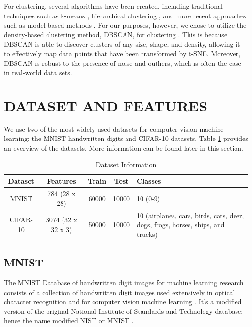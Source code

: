 \documentclass[12pt]{article}
\begin{document}
For clustering, several algorithms have been created, including traditional techniques such as k-means \cite{macqueen1967}, hierarchical clustering \cite{johnson1967}, and more recent approaches such as model-based methods \cite{fraley2002}. For our purposes, however, we chose to utilize the density-based clustering method, DBSCAN, for clustering \cite{ester1996}. This is because DBSCAN is able to discover clusters of any size, shape, and density, allowing it to effectively map data points that have been transformed by t-SNE. Moreover, DBSCAN is robust to the presence of noise and outliers, which is often the case in real-world data sets.


\section{DATASET AND FEATURES}

We use two of the most widely used datasets for computer vision machine learning: the MNIST handwritten digits and CIFAR-10 datasets. Table \ref{tab:datasets} provides an overview of the datasets. More information can be found later in this section.

\begin{table}[H]
    \centering
    \begin{tabular}{|c|c|c|c|p{7cm}|}
        \hline
        \textbf{Dataset} & \textbf{Features} & \textbf{Train} & \textbf{Test} & \textbf{Classes}   \\
        \hline
        MNIST & 784 (28 x 28) & 60000 & 10000 & 10 (0-9) \\ 
        CIFAR-10 & 3074 (32 x 32 x 3) & 50000 & 10000 & 10 \newline (airplanes, cars, birds, cats, deer, dogs, frogs, horses, ships, and trucks)\\
        \hline
    \end{tabular}
    \caption{Dataset Information}
    \label{tab:datasets}
\end{table}

\subsection{MNIST}

The MNIST Database of handwritten digit images for machine learning research consists of a collection of handwritten digit images used extensively in optical character recognition and for computer vision machine learning \cite{deng2012}. It’s a modified version of the original National Institute of Standards and Technology database; hence the name modified NIST or MNIST \cite{lecun1998}.
\end{document}
